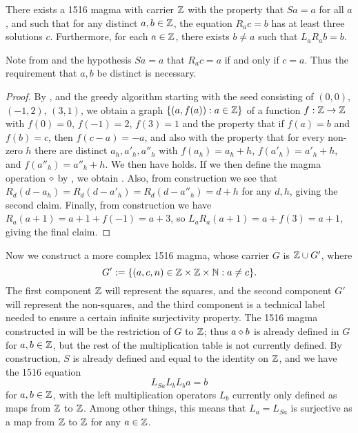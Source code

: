 \begin{corollary}\label{1516-base} There exists a 1516 magma with carrier $\mathbb{Z}$ with the property that $Sa=a$ for all $a$, and such that for any distinct $a,b \in \mathbb{Z}$, the equation $R_a c = b$ has at least three solutions $c$.  Furthermore, for each $a \in \mathbb{Z}$, there exists $b \neq a$ such that $L_a R_a b = b$.
\end{corollary}

Note from  and the hypothesis $Sa=a$ that $R_a c = a$ if and only if $c=a$.  Thus the requirement that $a,b$ be distinct is necessary.

\begin{proof}  By ,  and the greedy algorithm starting with the seed consisting of $(0,0)$, $(-1,2)$, $(3,1)$, we obtain a graph $\{ (a,f(a)): a \in \mathbb{Z} \}$ of a function $f:\mathbb{Z} \to \mathbb{Z}$ with $f(0)=0$, $f(-1)=2$, $f(3)=1$ and the property that if $f(a)=b$ and $f(b)=c$, then $f(c-a)=-a$, and also with the property that for every non-zero $h$ there are distinct $a_h, a'_h, a''_h$ with $f(a_h)=a_h+h$, $f(a'_h) = a'_h+h$, and $f(a''_h) = a''_h+h$.  We then have  holds.  If we then define the magma operation $\diamond$ by , we obtain .  Also, from construction we see that $R_d (d - a_h) = R_d (d - a'_h) = R_d (d - a''_h) = d+h$ for any $d,h$, giving the second claim.  Finally, from construction we have $R_a (a+1) = a+1+f(-1) = a+3$, so $L_a R_a (a+1) = a + f(3) = a+1$, giving the final claim.
\end{proof}

Now we construct a more complex 1516 magma, whose carrier $G$ is $\mathbb{Z} \cup G'$, where
$$G' := \{ (a,c,n) \in \mathbb{Z} \times \mathbb{Z} \times \mathbb{N} : a \neq c\}.$$
The first component $\mathbb{Z}$ will represent the squares, and the second component $G'$ will represent the non-squares, and the third component is a technical label needed to ensure a certain infinite surjectivity property.  The 1516 magma constructed in  will be the restriction of $G$ to $\mathbb{Z}$; thus $a \diamond b$ is already defined in $G$ for $a,b \in \mathbb{Z}$, but the rest of the multiplication table is not currently defined.  By construction, $S$ is already defined and equal to the identity on $\mathbb{Z}$, and we have the 1516 equation
$$ L_{Sa} L_b L_b a = b$$
for $a,b \in \mathbb{Z}$, with the left multiplication operators $L_b$ currently only defined as maps from $\mathbb{Z}$ to $\mathbb{Z}$.  Among other things, this means that $L_a = L_{Sa}$ is surjective as a map from $\mathbb{Z}$ to $\mathbb{Z}$ for any $a \in \mathbb{Z}$.

